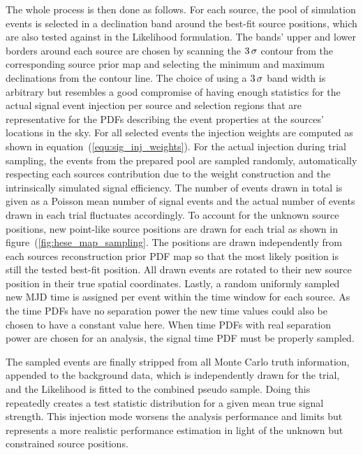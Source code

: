 The whole process is then done as follows.
For each source, the pool of simulation events is selected in a declination band around the best-fit source positions, which are also tested against in the Likelihood formulation.
The bands' upper and lower borders around each source are chosen by scanning the $\num{3}\,\sigma$ contour from the corresponding source prior map and selecting the minimum and maximum declinations from the contour line.
The choice of using a $\num{3}\,\sigma$ band width is arbitrary but resembles a good compromise of having enough statistics for the actual signal event injection per source and selection regions that are representative for the PDFs describing the event properties at the sources' locations in the sky.
For all selected events the injection weights are computed as shown in equation~(\ref{equ:sig_inj_weights}).
For the actual injection during trial sampling, the events from the prepared pool are sampled randomly, automatically respecting each sources contribution due to the weight construction and the intrinsically simulated signal efficiency.
The number of events drawn in total is given as a Poisson mean number of signal events and the actual number of events drawn in each trial fluctuates accordingly.
To account for the unknown source positions, new point-like source positions are drawn for each trial as shown in figure~(\ref{fig:hese_map_sampling}.
The positions are drawn independently from each sources reconstruction prior PDF map so that the most likely position is still the tested best-fit position.
All drawn events are rotated to their new source position in their true spatial coordinates.
Lastly, a random uniformly sampled new MJD time is assigned per event within the time window for each source.
As the time PDFs have no separation power the new time values could also be chosen to have a constant value here.
When time PDFs with real separation power are chosen for an analysis, the signal time PDF must be properly sampled.

The sampled events are finally stripped from all Monte Carlo truth information, appended to the background data, which is independently drawn for the trial, and the Likelihood is fitted to the combined pseudo sample.
Doing this repeatedly creates a test statistic distribution for a given mean true signal strength.
This injection mode worsens the analysis performance and limits but represents a more realistic performance estimation in light of the unknown but constrained source positions.

